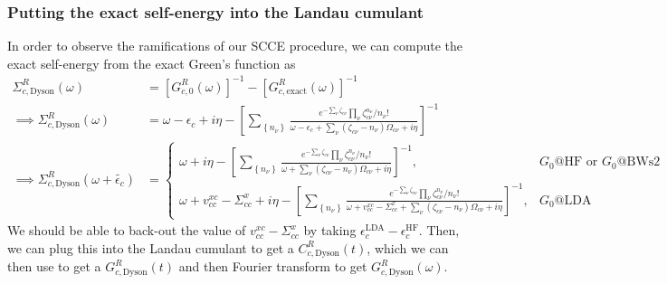 \subsubsection{Putting the exact self-energy into the Landau cumulant}
In order to observe the ramifications of our SCCE procedure, we can compute the exact self-energy from the exact Green's function as
\begin{align}
    \Sigma^R_{c,\text{Dyson}}(\omega) &= \left[G_{c,0}^R(\omega)\right]^{-1} - \left[G^R_{c,\text{exact}}(\omega)\right]^{-1} \\
\implies \Sigma^R_{c,\text{Dyson}}(\omega) &= \omega - \epsilon_c + i\eta - \left[\sum_{\left\{n_\nu\right\}} \frac{e^{-\sum_\nu \zeta_{c\nu}} \prod_\nu \zeta_{c\nu}^{n_\nu} / n_{\nu}!}{\omega-\epsilon_c+\sum_\nu (\zeta_{c\nu} - n_\nu) \Omega_{c\nu}+i \eta}\right]^{-1}\\
\implies \Sigma^R_{c,\text{Dyson}}(\omega+\tilde{\epsilon_c}) &= 
\begin{cases}
    \omega + i\eta - \left[\sum_{\left\{n_\nu\right\}} \frac{e^{-\sum_\nu \zeta_{c\nu}} \prod_\nu \zeta_{c\nu}^{n_\nu} / n_{\nu}!}{\omega+\sum_\nu (\zeta_{c\nu} - n_\nu) \Omega_{c\nu}+i \eta}\right]^{-1}, & G_0@\text{HF or } G_0@\text{BWs2}\\
    \omega + v^{xc}_{cc} - \Sigma_{cc}^x + i\eta - \left[\sum_{\left\{n_\nu\right\}} \frac{e^{-\sum_\nu \zeta_{c\nu}} \prod_\nu \zeta_{c\nu}^{n_\nu} / n_{\nu}!}{\omega+v^{xc}_{cc} - \Sigma_{cc}^x+\sum_\nu (\zeta_{c\nu} - n_\nu) \Omega_{c\nu}+i \eta}\right]^{-1}, & G_0@\text{LDA}
\end{cases}
\end{align}
We should be able to back-out the value of $v^{xc}_{cc} - \Sigma_{cc}^x$ by taking $\epsilon_c^{\text{LDA}} - \epsilon_c^{\text{HF}}$.
Then, we can plug this into the Landau cumulant to get a $C^R_{c,\text{Dyson}}(t)$, which we can then use to get a $G^R_{c,\text{Dyson}}(t)$ and then Fourier transform to get $G^R_{c,\text{Dyson}}(\omega)$.

